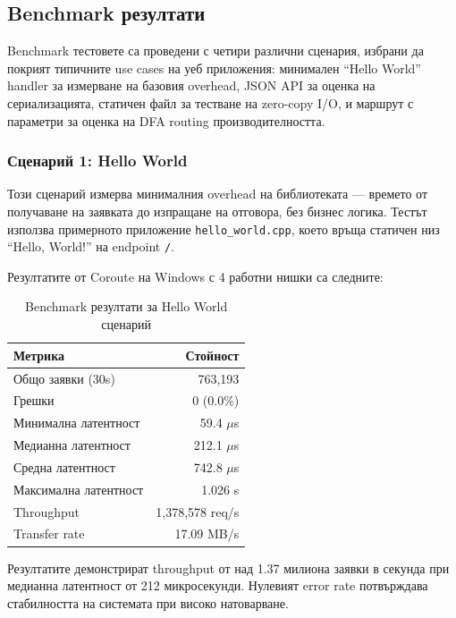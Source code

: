 \subsection{Benchmark резултати}

Benchmark тестовете са проведени с четири различни сценария, избрани да покрият типичните use cases на уеб приложения: минимален ``Hello World'' handler за измерване на базовия overhead, JSON API за оценка на сериализацията, статичен файл за тестване на zero-copy I/O, и маршрут с параметри за оценка на DFA routing производителността.

\subsubsection{Сценарий 1: Hello World}

Този сценарий измерва минималния overhead на библиотеката --- времето от получаване на заявката до изпращане на отговора, без бизнес логика. Тестът използва примерното приложение \texttt{hello\_world.cpp}, което връща статичен низ ``Hello, World!'' на endpoint \texttt{/}.

Резултатите от Coroute на Windows с 4 работни нишки са следните:

\begin{table}[H]
\centering
\caption{Benchmark резултати за Hello World сценарий}
\label{tab:hello_world_benchmark}
\begin{tabular}{|l|r|}
\hline
\textbf{Метрика} & \textbf{Стойност} \\
\hline
Общо заявки (30s) & 763,193 \\
Грешки & 0 (0.0\%) \\
Минимална латентност & 59.4 $\mu$s \\
Медианна латентност & 212.1 $\mu$s \\
Средна латентност & 742.8 $\mu$s \\
Максимална латентност & 1.026 s \\
Throughput & 1,378,578 req/s \\
Transfer rate & 17.09 MB/s \\
\hline
\end{tabular}
\end{table}

Резултатите демонстрират throughput от над 1.37 милиона заявки в секунда при медианна латентност от 212 микросекунди. Нулевият error rate потвърждава стабилността на системата при високо натоварване.

